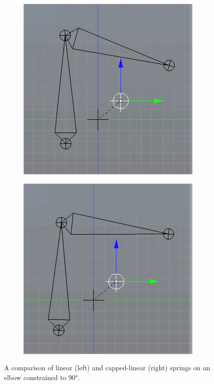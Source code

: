 \documentclass[10pt,twocolumn,letterpaper]{article}
\begin{document}
\begin{figure}
    \centering
    \begin{subfigure}{0.5\columnwidth}
        \centering
        \includegraphics[width=.8\linewidth]{linear-elbow.jpg}
    \end{subfigure}\begin{subfigure}{0.5\columnwidth}
        \centering
        \includegraphics[width=.8\linewidth]{capped-elbow.jpg}
    \end{subfigure}

    \caption{A comparison of linear (left) and capped-linear (right) springs on an elbow constrained to 90°.}
    \label{img:elbow}
\end{figure}
\end{document}
